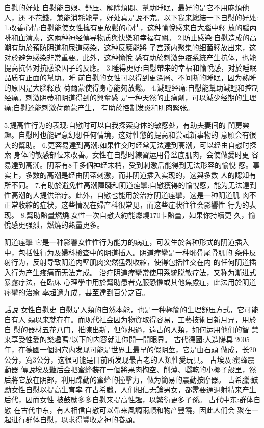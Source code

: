 \documentclass[12pt,UTF8]{ctexbook}
\begin{document}
自慰的好处
自慰能自娛、舒压、解除煩悶、幫助睡眠，最好的是它不用麻煩他人，还
不花錢，兼能消耗能量，好处真是說不完。以下我来總結一下自慰的好处:
1.改善心情:自慰能使女性擁有更放鬆的心情，这种愉悅感来自大腦中釋
放的腦丙啡和血清素，这兩种神经傳导物质與快樂和幸福有關。
2.防止感染:自慰造成的高潮有助於預防阴道和尿道感染，这种反應能將
子宫颈内聚集的细菌釋放出来，这对於避免感染非常重要。此外，这种愉悅
感有助於刺激免疫系統产生抗体，也能提高抗体对抗感染因子的反應。
3.睡得更好:自慰帶来的幸福和愉悅感，对於睡眠品质有正面的幫助。睡
前自慰的女性可以得到更深層、不间断的睡眠，因为熟睡的原因是大腦釋放
荷爾蒙使得身心能夠放鬆。
4.減輕经痛:自慰能幫助減輕和控制经痛。刺激阴蒂和阴道得到的興奮感
是一种天然的止痛劑，可以減少经期的生理痛;自慰还能刺激荷爾蒙产生，
有助於控制发炎和肌肉緊张。

5.提高性行为的表现:自慰时可以自我探索身体的敏感处，有助夫妻间的
閨房樂趣。自慰时也能肆意幻想任何情境，这对性慾的提高和尝試新事物的
意願会有很大的幫助。
6.更容易達到高潮:如果性交时经常无法達到高潮，可以经由自慰时探索
身体的敏感部位来改善。女性在自慰时練習运用骨盆底肌肉，会使做愛时更
容易達到高潮。阴蒂有8千多個神经末梢，受到刺激后能得到无法形容的愉悅
感。事实上，多数的高潮是经由阴蒂刺激，而非阴道插入实现的，这與多数
人的認知有所不同。
7.有助於避免性高潮障礙和阴道痙攣:自慰獲得的愉悅感，能为无法達到
性高潮的人提供治疗。此外，自慰也能用於治疗阴道痙攣，这是一种阴道肌
肉不正常收縮的症状，这些情况在婦产科很常见，而这些症状往往会影響性
行为的表现。
8.幫助熱量燃燒:女性一次自慰大約能燃燒170卡熱量，如果你持續更
久，愉悅感更强烈，燃燒的熱量更多。

阴道痙攣
它是一种影響女性性行为能力的病症，可发生於各种形式的阴道插入
中，包括性行为及婦科檢查中的阴道插入。阴道痙攣是一种恥骨尾骨肌的
条件反射行为，反射导致阴道内壁肌肉突然猛烈收縮，使得包括性交在内
的任何阴道插入行为产生疼痛而无法完成。
治疗阴道痙攣常使用系統脱敏疗法，又称为漸进式暴露疗法，在臨床
心理學中用於幫助患者克服恐懼或其他焦慮症，此法用於阴道痙攣的治癒
率超過九成，甚至達到百分之百。

話說
女性自慰史
自慰是人類的自然本能，也是一种極簡的生理舒压方式，它可能自有人
類以来就存在。而现代社会因为物資取得容易，工藝技術日新月异，用於自
慰的器材五花八门，推陳出新，但你想過，遠古的人類，如何运用他们的智
慧来享受性愛的樂趣嗎?以下的内容就让你開一開眼界。
古代德國:人造陽具
2005年，在德國一個洞穴内发现可能是世界上最早的假阴莖，它是由石頭
做成，长20公分，寬3公分，这很可能是目前所发现最古老的人類性愛玩具。
古埃及:蜜蜂震動器
傳說埃及豔后会把蜜蜂裝在一個將果肉掏空、削薄、曬乾的小椰子殼里，然后將它放在阴部，利用躁動的蜜蜂的撞擊力，做为簡易的震動按摩器。
古希臘:鼓勵女性自慰以提高生育率
在古希臘，人们相信无論男女，都需要通過射精来产生后代，因而女性
被鼓勵多多自慰来提高性趣，以繁衍更多子孫。
古代中东:群体自慰
在古代中东，有人相信自慰可以帶来風調雨順和物产豐饒，因此人们会
聚在一起进行群体自慰，以求得豐收之神的眷顧。
\end{document}
